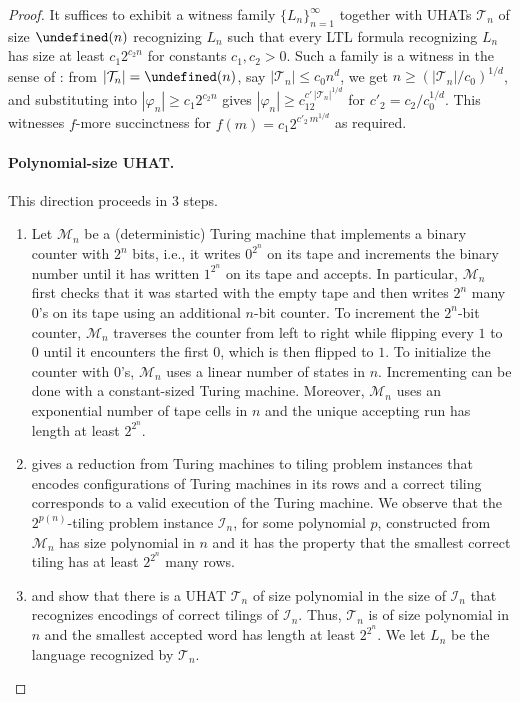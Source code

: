 \documentclass{article} %
\let\poly\undefined
\DeclareMathOperator{\poly}{poly}
\newcommand{\trans}{\mathcal{T}}
\newcommand{\Lang}{L}
\newcommand{\TM}{\mathcal{M}}
\newcommand{\TI}{\mathcal{I}}
\begin{document}
\begin{proof}
It suffices to exhibit a witness family $\{\Lang_n\}_{n=1}^\infty$ together with UHATs $\trans_n$ of size $\poly(n)$ recognizing $\Lang_n$ such that every LTL formula recognizing $\Lang_n$ has size at least $c_1 2^{c_2 n}$ for constants $c_1, c_2>0$. Such a family is a witness in the sense of : from $|\trans_n| = \poly(n)$, say $|\trans_n| \le c_0 n^d$, we get $n \ge (|\trans_n|/c_0)^{1/d}$, and substituting into $|\varphi_n| \ge c_1 2^{c_2n}$ gives $|\varphi_n| \ge c_12^{c'\,|\trans_n|^{1/d}}$ for $c'_2 = c_2/c_0^{1/d}$. This witnesses $f$-more succinctness for $f(m) = c_1 2^{c'_2\,m^{1/d}}$ as required.

\paragraph{Polynomial-size UHAT.}
This direction proceeds in 3 steps.
\begin{enumerate}[itemsep=2pt, topsep=2pt, parsep=0pt, leftmargin=1.5em]
    \item Let $\TM_n$ be a (deterministic) Turing machine that implements a binary counter with $2^n$ bits,
    i.e., it writes $0^{2^n}$ on its tape and increments the binary number until it has written $1^{2^n}$ on its tape and accepts.
    In particular, $\TM_n$ first checks that it was started with the empty tape and then writes $2^n$ many $0$'s on its tape
    using an additional $n$-bit counter.
    To increment the $2^n$-bit counter, $\TM_n$ traverses the counter from left to right while
    flipping every $1$ to $0$ until it encounters the first $0$, which is then flipped to $1$.
    To initialize the counter with $0$'s, $\TM_n$ uses a linear number of states in $n$.
    Incrementing can be done with a constant-sized Turing machine.
    Moreover, $\TM_n$ uses an exponential number of tape cells in $n$ and
    the unique accepting run has length at least $2^{2^n}$.
    \item {} gives a reduction from Turing machines to tiling problem instances
    that encodes configurations of Turing machines in its rows and
    a correct tiling corresponds to a valid execution of the Turing machine.
    We observe that the $2^{p(n)}$-tiling problem instance $\TI_n$,
    for some polynomial $p$,
    constructed from $\TM_n$ has size polynomial in $n$
    and it has the property that the smallest correct tiling has at least $2^{2^n}$ many rows.
    \item {} and  show
    that there is a UHAT $\trans_n$ of size polynomial in the size of $\TI_n$
    that recognizes encodings of correct tilings of $\TI_n$.
    Thus, $\trans_n$ is of size polynomial in $n$ and the smallest accepted word has length at least $2^{2^n}$.
    We let $L_n$ be the language recognized by $\trans_n$.
\end{enumerate}


\end{proof}
\end{document}

